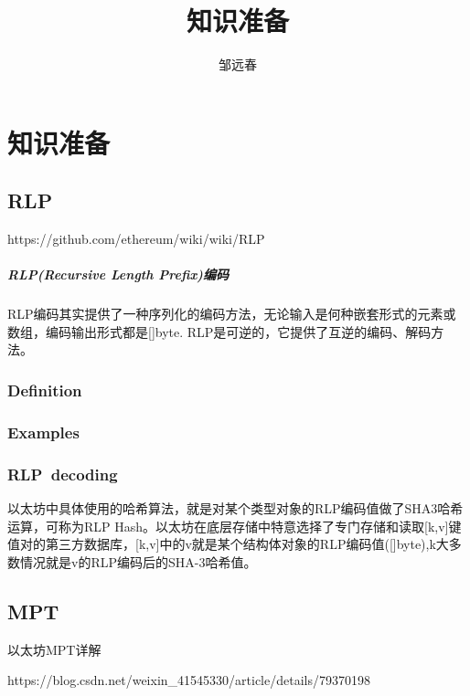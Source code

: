 \documentclass[UTF8]{ctexart}
\title{知识准备}
\author{邹远春}
\date{}
\begin{document}
\maketitle
\else
\chapter{知识准备}
\fi
\section{RLP}

https://github.com/ethereum/wiki/wiki/RLP

\paragraph{RLP(Recursive Length Prefix)编码}

RLP编码其实提供了一种序列化的编码方法，无论输入是何种嵌套形式的元素或数组，编码输出形式都是[]byte.
RLP是可逆的，它提供了互逆的编码、解码方法。

\subsection{Definition}

\subsection{Examples}

\subsection{RLP~decoding}

以太坊中具体使用的哈希算法，就是对某个类型对象的RLP编码值做了SHA3哈希运算，可称为RLP Hash。以太坊在底层存储中特意选择了专门存储和读取[k,v]键值对的第三方数据库，[k,v]中的v就是某个结构体对象的RLP编码值([]byte),k大多数情况就是v的RLP编码后的SHA-3哈希值。

\section{MPT}

以太坊MPT详解

https://blog.csdn.net/weixin\_41545330/article/details/79370198
\end{document}
